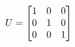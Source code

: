 \documentclass[preview]{standalone}
\begin{document}
\begin{align*}
\special{dvisvgm:raw <g id='unique000'>}U = \begin{bmatrix} 1 & 0 & 0 \\ 0 & 1 & 0 \\ 0 & 0 & 1 \end{bmatrix}\special{dvisvgm:raw </g>}
\end{align*}
\end{document}
